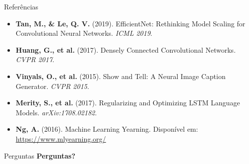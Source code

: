 \documentclass{beamer}
\begin{document}
\begin{frame}{Referências}
\footnotesize
\begin{itemize}
    \item \textbf{Tan, M., \& Le, Q. V.} (2019). EfficientNet: Rethinking Model Scaling for Convolutional Neural Networks. \textit{ICML 2019}.
    
    \item \textbf{Huang, G., et al.} (2017). Densely Connected Convolutional Networks. \textit{CVPR 2017}.
    
    \item \textbf{Vinyals, O., et al.} (2015). Show and Tell: A Neural Image Caption Generator. \textit{CVPR 2015}.
    
    \item \textbf{Merity, S., et al.} (2017). Regularizing and Optimizing LSTM Language Models. \textit{arXiv:1708.02182}.
    
    \item \textbf{Ng, A.} (2016). Machine Learning Yearning. Disponível em: \url{https://www.mlyearning.org/}
\end{itemize}
\end{frame}

\begin{frame}{Perguntas}
\centering
\Large
\textbf{Perguntas?}

\vspace{1cm}

\end{frame}
\end{document}
